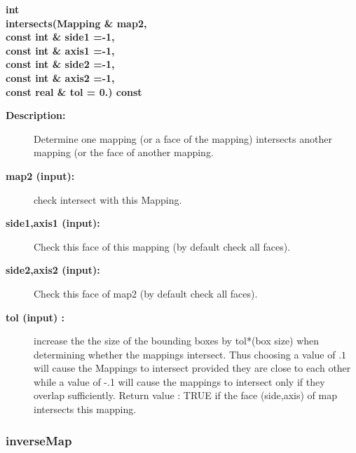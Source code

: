 \begin{flushleft} \textbf{%
int  \\ 
\settowidth{\MappingIncludeArgIndent}{intersects(}%
intersects(Mapping \& map2, \\ 
\hspace{\MappingIncludeArgIndent}const int \& side1  =-1, \\ 
\hspace{\MappingIncludeArgIndent}const int \& axis1  =-1,\\ 
\hspace{\MappingIncludeArgIndent}const int \& side2  =-1, \\ 
\hspace{\MappingIncludeArgIndent}const int \& axis2  =-1,\\ 
\hspace{\MappingIncludeArgIndent}const real \& tol  = 0.) const
}\end{flushleft}
\begin{description}
\item[{\bf Description:}] 
    Determine one mapping (or a face of the mapping) intersects another mapping (or the face of another
     mapping.

\item[{\bf map2 (input):}]   check intersect with this Mapping.
\item[{\bf side1,axis1 (input):}]  Check this face of this mapping (by default check all faces).
\item[{\bf side2,axis2 (input):}]  Check this face of map2 (by default check all faces).
\item[{\bf tol (input) :}]  increase the the size of the bounding boxes by tol*(box size) when determining 
   whether the mappings intersect. Thus choosing a value of $.1$ will cause the Mappings
    to intersect provided they are close to each other while a value of -.1 will cause the
    mappings to intersect only if they overlap sufficiently.
 Return value : TRUE if the face (side,axis) of map intersects this mapping.
\end{description}
\subsubsection{inverseMap}
 
